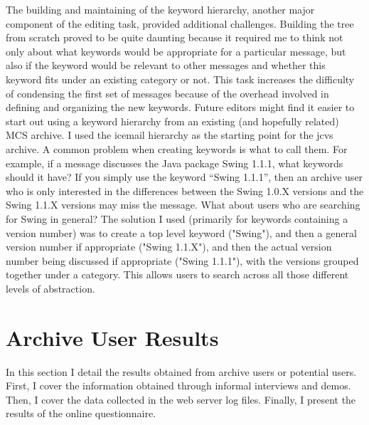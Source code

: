 The building and maintaining of the keyword hierarchy, another major component
of the editing task, provided additional challenges. Building the tree from
scratch proved to be quite daunting because it required me to think not only
about what keywords would be appropriate for a particular message, but also if
the keyword would be relevant to other messages and whether this keyword fits
under an existing category or not. This task increases the difficulty of
condensing the first set of messages because of the overhead involved in
defining and organizing the new keywords. Future editors might find it easier
to start out using a keyword hierarchy from an existing (and hopefully related)
MCS archive.  I used the icemail hierarchy as the starting point for the jcvs
archive. A common problem when creating keywords is what to call them. For
example, if a message discusses the Java package Swing 1.1.1, what keywords
should it have?  If you simply use the keyword ``Swing 1.1.1'', then an archive
user who is only interested in the differences between the Swing 1.0.X versions
and the Swing 1.1.X versions may miss the message. What about users who are
searching for Swing in general? The solution I used (primarily for keywords
containing a version number) was to create a top level keyword ("Swing"), and
then a general version number if appropriate ("Swing 1.1.X"), and then the
actual version number being discussed if appropriate ("Swing 1.1.1"), with the
versions grouped together under a category. This allows users to search across
all those different levels of abstraction.

\section{Archive User Results}
\label{sec:archive-user-results}
In this section I detail the results obtained from archive users or potential
users. First, I cover the information obtained through informal interviews and
demos. Then, I cover the data collected in the web server log files. Finally, I
present the results of the online questionnaire.

